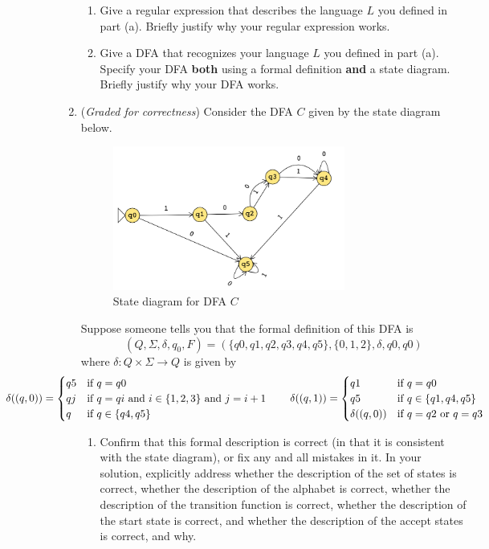 \documentclass[12pt, oneside]{article}
\begin{document}
\begin{enumerate}
\begin{enumerate}
\item Give a regular expression that describes the language $L$ you defined in part (a).  
Briefly justify why your regular expression
works.
\item Give a DFA that recognizes your language $L$ you defined in part (a).  
Specify your DFA {\bf both} using a formal definition
{\bf and} a state diagram. Briefly justify why your DFA works.
\end{enumerate}

\item ({\it Graded for correctness}) Consider the DFA $C$ given by the state diagram below.
\begin{figure}[h]
   \centering
   \includegraphics[width=3in]{../../resources/machines/hw1dfaCSE105Sp22.png}
   \caption{State diagram for DFA $C$}
\end{figure}

Suppose someone tells you that the formal definition of this DFA is 
\[
(Q, \Sigma, \delta, q_0, F) =  (\{ q0, q1, q2, q3, q4, q5 \}, \{0,1,2\}, \delta, q0, q0)
\]
where $\delta: Q \times \Sigma \to Q$ is given by 
\[
\hspace{-1in}\delta ( (q, 0) ) = \begin{cases}
q5 & \text{if $q=q0$} \\
qj & \text{if $q=qi$ and $i \in \{1,2,3\}$ and $j=i+1$} \\
q & \text{if $q \in \{q4,q5\}$} \\
\end{cases}  \qquad \delta ( (q, 1) ) = \begin{cases}
    q1 & \text{if $q=q0$} \\
    q5 & \text{if $q \in \{q1,q4,q5\}$} \\
    \delta( (q,0) ) & \text{if $q=q2$ or $q=q3$} \\
    \end{cases}
\]
\begin{enumerate}
\item Confirm that this formal description is correct (in that it is consistent with the 
state diagram), or fix any and all mistakes in it.
In your solution, explicitly address whether the description of the set of states is correct, whether the 
description of the alphabet is correct, 
whether the description of the transition function is correct, 
whether the description of the start state is correct, and whether 
the description of the accept states is correct, and why.


\end{enumerate}
\end{enumerate}
\end{document}
